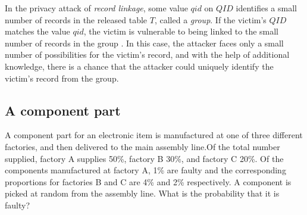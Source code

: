 In the privacy attack of \emph{record linkage}, some value $qid$ on $QID$ identifies a small number of records in the released table $T$,
called a \emph{group}. If the victim's $QID$ matches the value
$qid$, the victim is vulnerable to being linked to the small
number of records in the group \cite{madden2005taq}. In this case, the attacker faces
only a small number of possibilities for the victim's record, and
with the help of additional knowledge, there is a chance that the
attacker could uniquely identify the victim's record from the
group.





\subsection{A component part}
A component part for an electronic item is
manufactured at one of three different factories, and then delivered to
the main assembly line.Of the total number supplied, factory A supplies
50\%, factory B 30\%, and factory C 20\%. Of the components
manufactured at factory A, 1\% are faulty and the corresponding
proportions for factories B and C are 4\% and 2\% respectively. A
component is picked at random from the assembly line. What is the
probability that it is faulty?



